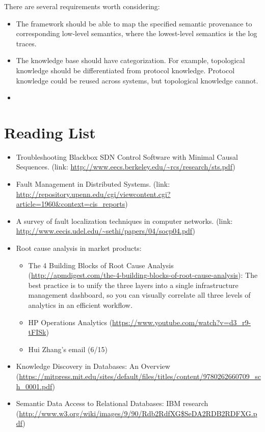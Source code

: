 \documentclass{article}
\begin{document}
\begin{itemize}
  There are several requirements worth considering:
  \begin{itemize}
  \item The framework should be able to map the specified semantic provenance to
    corresponding low-level semantics, where the lowest-level semantics is the
    log traces. 
  
  \item The knowledge base should have categorization. For example, topological
    knowledge should be differentiated from protocol knowledge. Protocol
    knowledge could be reused across systems, but topological knowledge cannot.

  \item 
  \end{itemize}

  \end{itemize}

\section{Reading List}
\label{sec:read}

\begin{itemize}

\item Troubleshooting Blackbox SDN Control Software with Minimal Causal
Sequences. (link: \url{http://www.eecs.berkeley.edu/~rcs/research/sts.pdf})

\item Fault Management in Distributed Systems. (link:
\url{http://repository.upenn.edu/cgi/viewcontent.cgi?article=1960&context=cis_reports}) 

\item A survey of fault localization techniques in computer networks. (link:
  \url{http://www.eecis.udel.edu/~sethi/papers/04/socp04.pdf})

\item Root cause analysis in market products:

  \begin{itemize}
  \item The 4 Building Blocks of Root Cause Analysis
    (\url{http://apmdigest.com/the-4-building-blocks-of-root-cause-analysis}): The
    best practice is to unify the three layers into a single infrastructure
    management dashboard, so you can visually correlate all three levels of
    analytics in an efficient workflow.
  \item HP Operations Analytics (\url{https://www.youtube.com/watch?v=d3_r9-tFISk})
  \item Hui Zhang's email (6/15)
  \end{itemize}

\item Knowledge Discovery in Databases: An Overview 
(\url{https://mitpress.mit.edu/sites/default/files/titles/content/9780262660709_sch_0001.pdf})

\item Semantic Data Access to Relational Databases: IBM research
(\url{http://www.w3.org/wiki/images/9/90/Rdb2RdfXG$SeDA2RDB2RDFXG.pdf})

\end{itemize}
\end{document}
